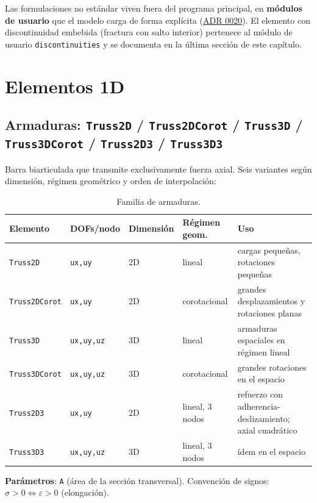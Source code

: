 \documentclass[11pt,oneside]{report}
\begin{document}
Las formulaciones no estándar viven fuera del programa principal, en \textbf{módulos de usuario} que el modelo carga de forma explícita (\href{https://github.com/jretamav/solidum-fem/blob/main/docs/adr/0020-modulos-de-usuario.md}{ADR 0020}). El elemento con discontinuidad embebida (fractura con salto interior) pertenece al módulo de usuario \texttt{discontinuities} y se documenta en la última sección de este capítulo.

\section{Elementos 1D}

\subsection{Armaduras: \texttt{Truss2D} / \texttt{Truss2DCorot} / \texttt{Truss3D} / \texttt{Truss3DCorot} / \texttt{Truss2D3} / \texttt{Truss3D3}}

Barra biarticulada que transmite exclusivamente fuerza axial. Seis variantes según dimensión, régimen geométrico y orden de interpolación:

\begin{table}[h]
\centering
\caption{Familia de armaduras.}
\begin{tabularx}{\textwidth}{YYYYY}
\hline
\textbf{Elemento} & \textbf{DOFs/nodo} & \textbf{Dimensión} & \textbf{Régimen geom.} & \textbf{Uso} \\
\hline
\texttt{Truss2D} & \texttt{ux,uy} & 2D & lineal & cargas pequeñas, rotaciones pequeñas \\
\texttt{Truss2DCorot} & \texttt{ux,uy} & 2D & corotacional & grandes desplazamientos y rotaciones planas \\
\texttt{Truss3D} & \texttt{ux,uy,uz} & 3D & lineal & armaduras espaciales en régimen lineal \\
\texttt{Truss3DCorot} & \texttt{ux,uy,uz} & 3D & corotacional & grandes rotaciones en el espacio \\
\texttt{Truss2D3} & \texttt{ux,uy} & 2D & lineal, 3 nodos & refuerzo con adherencia-deslizamiento; axial cuadrático \\
\texttt{Truss3D3} & \texttt{ux,uy,uz} & 3D & lineal, 3 nodos & ídem en el espacio \\
\hline
\end{tabularx}
\end{table}
\textbf{Parámetros}: \texttt{A} (área de la sección transversal). Convención de signos: $\sigma > 0 \Leftrightarrow \varepsilon > 0$ (elongación).
\end{document}
